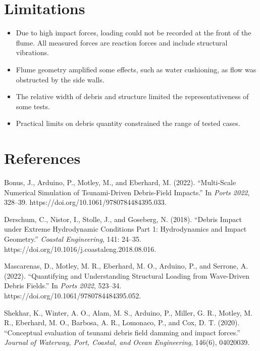 \documentclass{article}
\begin{document}
\section{Limitations}
\begin{itemize}
    \item Due to high impact forces, loading could not be recorded at the front of the flume. All measured forces are reaction forces and include structural vibrations.
    \item Flume geometry amplified some effects, such as water cushioning, as flow was obstructed by the side walls.
    \item The relative width of debris and structure limited the representativeness of some tests.
    \item Practical limits on debris quantity constrained the range of tested cases.
\end{itemize}

\section{References}
Bonus, J., Arduino, P., Motley, M., and Eberhard, M. (2022). ``Multi-Scale Numerical Simulation of Tsunami-Driven Debris-Field Impacts.'' In \textit{Ports 2022}, 328--39. https://doi.org/10.1061/9780784484395.033.

Derschum, C., Nistor, I., Stolle, J., and Goseberg, N. (2018). ``Debris Impact under Extreme Hydrodynamic Conditions Part 1: Hydrodynamics and Impact Geometry.'' \textit{Coastal Engineering}, 141: 24--35. https://doi.org/10.1016/j.coastaleng.2018.08.016.

Mascarenas, D., Motley, M. R., Eberhard, M. O., Arduino, P., and Serrone, A. (2022). ``Quantifying and Understanding Structural Loading from Wave-Driven Debris Fields.'' In \textit{Ports 2022}, 523--34. https://doi.org/10.1061/9780784484395.052.

Shekhar, K., Winter, A. O., Alam, M. S., Arduino, P., Miller, G. R., Motley, M. R., Eberhard, M. O., Barbosa, A. R., Lomonaco, P., and Cox, D. T. (2020). ``Conceptual evaluation of tsunami debris field damming and impact forces.'' \textit{Journal of Waterway, Port, Coastal, and Ocean Engineering}, 146(6), 04020039.
\end{document}
